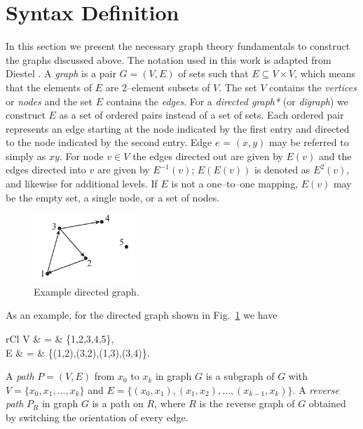 \section{Syntax Definition}
	\label{s:syntax definition}
	In this section we present the necessary graph theory fundamentals to 
	construct the graphs discussed above. 
	The notation used in this work is adapted from Diestel \cite{Diestel2010}. 
	A \emph{graph} is a pair $G = (V,E)$ of sets such that $E \subseteq V \times V$, 
	which means that the elements of $E$ are 2--element subsets of $V$. The set $V$ 
	contains the \emph{vertices} or \emph{nodes} and the set $E$ contains the \emph{edges}.
	For a \emph{directed graph*} (or \emph{digraph}) we construct $E$ as a set of ordered pairs instead 
	of a set of sets. Each ordered pair represents an edge starting at the node 
	indicated by the first entry and directed to the node indicated by the second 
	entry. Edge $e$ = $(x,y)$ may be referred to simply as $xy$. For node $v \in V$ 
	the edges directed out are given by $E(v)$ and the edges directed into $v$ are given 
	by $E^{-1}(v)$; $E(E(v))$ is denoted as $E^2(v)$, and likewise for additional levels. 
	If $E$ is not a one--to--one mapping, $E(v)$ may be the empty set, a single node, or a set of nodes.
	\begin{figure}[htb!]
		\begin{center}
		\includegraphics[width=1.5in]{images/example_directed_graph}
		\end{center}
		\vspace{-20pt}
	\caption{Example directed graph.}
	\label{f:example directed graph}
	\end{figure}
	As an example, for the directed graph shown in Fig.~\ref{f:example directed graph} we have
	\begin{IEEEeqnarray*}{rCl}
	V & = & \{1,2,3,4,5\}, \\
	E & = & \big\{(1,2),(3,2),(1,3),(3,4)\big\}.
	\end{IEEEeqnarray*}

	A \emph{path} $P=(V,E)$ from $x_0$ to $x_k$ in graph $G$ is a subgraph of $G$ with $V = \{x_0,x_1,\ldots,x_k\}$ and $E = \{(x_0,x_1),(x_1,x_2),\ldots,(x_{k-1},x_k)\}$.
	A \emph{reverse path} $P_R$ in graph $G$ is a path on $R$, where $R$ is the reverse graph of $G$ obtained by switching the orientation of every edge.


